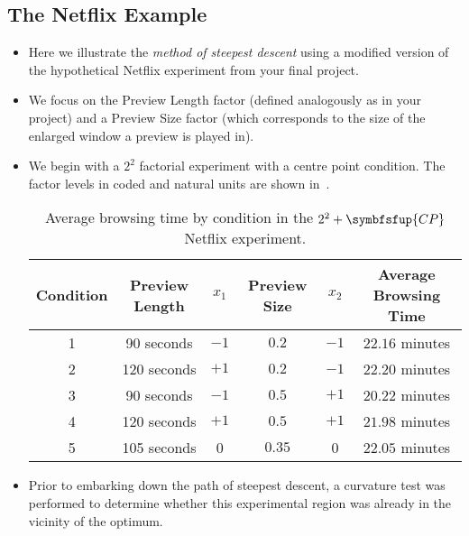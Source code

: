 \subsection{The Netflix Example}
\begin{itemize}
      \item Here we illustrate the \emph{method of steepest descent} using a modified version of the hypothetical Netflix
            experiment from your final project.
      \item We focus on the Preview Length factor (defined analogously as in your project) and a Preview Size
            factor (which corresponds to the size of the enlarged window a preview is played in).
      \item We begin with a $2^2$ factorial experiment with a centre point condition. The factor levels in coded and
            natural units are shown in~.
            \begin{table}[!htbp]
                  \centering
                  \caption{Average browsing time by condition in the $2^2 + \symbfsfup{CP}$ Netflix experiment.}\label{tab:netflixtab1}
                  \begin{tabular}{cccccc}
                        \toprule Condition & Preview Length & $x_{1}$ & Preview Size & $x_{2}$ & Average Browsing Time \\
                        \midrule 1         & 90 seconds     & $-1$    & $0.2$        & $-1$    & $22.16$ minutes       \\
                        2                  & 120 seconds    & $+1$    & $0.2$        & $-1$    & $22.20$ minutes       \\
                        3                  & 90 seconds     & $-1$    & $0.5$        & $+1$    & $20.22$ minutes       \\
                        4                  & 120 seconds    & $+1$    & $0.5$        & $+1$    & $21.98$ minutes       \\
                        5                  & 105 seconds    & 0       & $0.35$       & 0       & $22.05$ minutes       \\
                        \bottomrule
                  \end{tabular}
            \end{table}
      \item Prior to embarking down the path of steepest descent, a curvature test was performed to determine
            whether this experimental region was already in the vicinity of the optimum.

\end{itemize}
